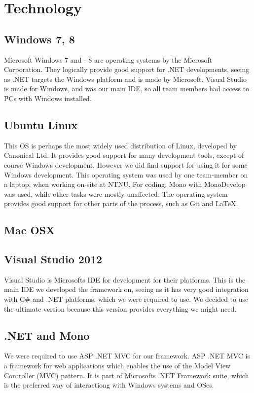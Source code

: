 \documentclass[12pt, a4paper]{article}
\begin{document}
\section{Technology}

\subsection{Windows 7, 8}
Microsoft Windows 7 and - 8 are operating systems by the Microsoft Corporation. They logically provide good support for .NET developments, seeing as .NET targets the Windows platform and is made by Microsoft. Visual Studio is made for Windows, and was our main IDE, so all team members had access to PCs with Windows installed.

\subsection{Ubuntu Linux}
This OS is perhaps the most widely used distribution of Linux, developed by Canonical Ltd. It provides good support for many development tools, except of course Windows development. However we did find support for using it for some Windows development.
This operating system was used by one team-member on a laptop, when working on-site at NTNU. For coding, Mono with MonoDevelop was used, while other tasks were mostly unaffected. The operating system provides good support for other parts of the process, such as Git and \LaTeX.

\subsection{Mac OSX}

\subsection{Visual Studio 2012}
Visual Studio is Microsofts IDE for development for their platforms. This is the main IDE we developed the framework on, seeing as it has very good integration with C\# and .NET platforms, which we were required to use. We decided to use the ultimate version because this version provides everything we might need.

\subsection{.NET and Mono}
We were required to use ASP .NET MVC for our framework. ASP .NET MVC is a framework for web applications which enables the use of the Model View Controller (MVC) pattern. It is part of Microsofts .NET Framework suite, which is the preferred way of interactiong with Windows systems and OSes.
\end{document}
